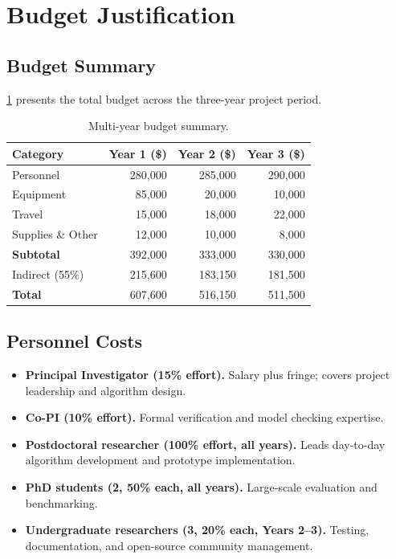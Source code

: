 \documentclass[
    language=english,
    doctype=grant-proposal,
    institution=none,
]{../../omnilatex}
\begin{document}
\newpage

\section*{Budget Justification}

\subsection{Budget Summary}
\cref{tab:budget-summary} presents the total budget across the
three-year project period.

\begin{table}[htbp]
    \centering
    \caption{Multi-year budget summary.}
    \label{tab:budget-summary}
    \begin{tabular}{@{}lrrr@{}}
        \toprule
        \textbf{Category} & \textbf{Year 1 (\$)} &
        \textbf{Year 2 (\$)} & \textbf{Year 3 (\$)} \\
        \midrule
        Personnel          & 280{,}000 & 285{,}000 & 290{,}000 \\
        Equipment          &  85{,}000 &  20{,}000 &  10{,}000 \\
        Travel             &  15{,}000 &  18{,}000 &  22{,}000 \\
        Supplies \& Other  &  12{,}000 &  10{,}000 &   8{,}000 \\
        \midrule
        \textbf{Subtotal}  & 392{,}000 & 333{,}000 & 330{,}000 \\
        Indirect (55\%)    & 215{,}600 & 183{,}150 & 181{,}500 \\
        \midrule
        \textbf{Total}     & 607{,}600 & 516{,}150 & 511{,}500 \\
        \bottomrule
    \end{tabular}
\end{table}

\subsection{Personnel Costs}
\begin{itemize}
    \item \textbf{Principal Investigator (15\% effort).}
          Salary plus fringe; covers project leadership and algorithm design.
    \item \textbf{Co-PI (10\% effort).}
          Formal verification and model checking expertise.
    \item \textbf{Postdoctoral researcher (100\% effort, all years).}
          Leads day-to-day algorithm development and prototype implementation.
    \item \textbf{PhD students (2, 50\% each, all years).}
          Large-scale evaluation and benchmarking.
    \item \textbf{Undergraduate researchers (3, 20\% each, Years 2--3).}
          Testing, documentation, and open-source community management.
\end{itemize}
\end{document}
